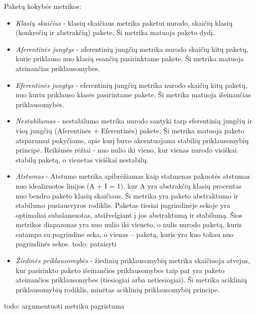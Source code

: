 Paketų kokybės metrikos:
\begin{itemize}
    \item \textit{Klasių skaičius} - klasių skaičiaus metrika paketui nurodo, skaičių klasių (konkrečių ir abstrakčių) pakete.
    Ši metrika matuoja paketo dydį.
    \item \textit{Aferentinės jungtys } - aferentinių jungčių metrika nurodo
    skaičių kitų paketų, kurie priklauso nuo klasių esančių pasirinktame pakete.
    Ši metrika matuoja ateinančias priklausomybes.
    \item \textit{Eferentinės jungtys } - eferentinių jungčių metrika nurodo skaičių kitų paketų,
    nuo kuriu priklauso klasės pasirintame pakete.
    Ši metrika matuoja išeinančias priklausomybės.
    \item \textit{Nestabilumas} - nestabilumo metrika nurodo santyki tarp eferentinių jungčių ir
    visų jungčių (Aferentinės + Eferentinės) pakete.
    Ši metrika matuoja paketo atsparumui pokyčiams, apie kurį buvo akcentuojama stabilių priklausomybių principė.
    Reikšmės rėžiai - nuo nulio iki vieno, kur vienas nurodo visiškai stabilų paketą, o vienetas visiškai nestabilų.
    \item \textit{Atstumas} - Atstumo metrika apibrėžiamas kaip statmenas pakuotės atstumas nuo idealizuotos linijos (A + I = 1),
    kur A yra abstrakčių klasių procentas nuo bendro paketo klasių skaičiaus.
    Ši metrika yra paketo abstraktumo ir stabilumo pusiausvyros rodiklis.
    Paketas tiesiai pagrindinėje sekoje yra optimaliai subalansuotas, atsižvelgiant į jos abstraktumą ir stabilumą.
    Šios metrikos diapazonas yra nuo nulio iki vieneto, o nulis nurodo paketą, kuris sutampa su pagrindine seka,
    o vienas – paketą, kuris yra kuo toliau nuo pagrindinės sekos. todo: pataisyti
    \item \textit{Žiedinės priklausomybės} - žiedinių priklausomybių metrika skaičiuoja atvejus,
    kur pasirinkto paketo išeinančios priklausomybes taip pat yra paketo ateinančios priklausomybes (tiesiogiai arba netiesiogiai).
    Ši metrika aciklinių priklausomybių rodiklis, minėtas aciklinių priklausomybių principe.
\end{itemize}

todo: argumentuoti metriku pagristuma